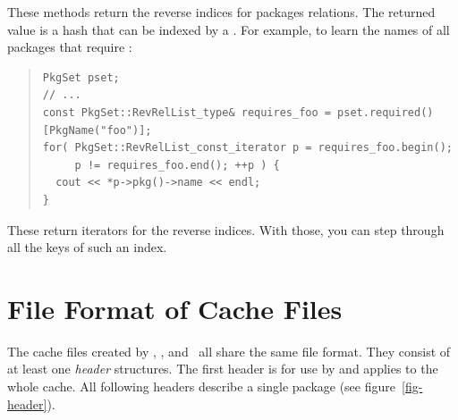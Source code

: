 \documentclass[10pt]{article}
\begin{document}
These methods return the reverse indices for packages relations. The
returned value is a hash that can be indexed by a . For
example, to learn the names of all packages that require :
\begin{quote}
\begin{verbatim}
PkgSet pset;
// ...
const PkgSet::RevRelList_type& requires_foo = pset.required()[PkgName("foo")];
for( PkgSet::RevRelList_const_iterator p = requires_foo.begin();
     p != requires_foo.end(); ++p ) {
  cout << *p->pkg()->name << endl;
}
\end{verbatim}
\end{quote}

These return iterators for the reverse indices. With those, you can
step through all the keys of such an index.




\section{File Format of Cache Files}
\label{fileformat}

The cache files created by \MKSUMPROG, \ASCIITOSUMPROG, and
\ICACHEPROG\ all share the same file format. They consist of at least
one {\em header} structures. The first header is for use by
 and applies to the whole cache. All following headers
describe a single package (see figure~\ref{fig-header}).
\end{document}

